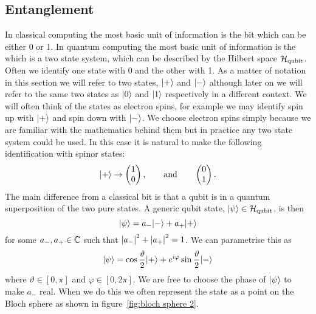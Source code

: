     \subsection{Entanglement}
    In classical computing the most basic unit of information is the bit which can be either 0 or 1.
    In quantum computing the most basic unit of information is the  which is a two state system, which can be described by the Hilbert space \(\mathcal{H}_\text{qubit}\).
    Often we identify one state with 0 and the other with 1.
    As a matter of notation in this section we will refer to two states, \(\vert {+} \rangle\) and \(\vert {-} \rangle\) although later on we will refer to the same two states as \(\vert {0} \rangle\) and \(\vert {1} \rangle\) respectively in a different context.
    We will often think of the states as electron spins, for example we may identify spin up with \(\vert {+} \rangle\) and spin down with \(\vert {-} \rangle\).
    We choose electron spins simply because we are familiar with the mathematics behind them but in practice any two state system could be used.
    In this case it is natural to make the following identification with spinor states:
    \[
        \vert {+} \rangle \mathrel{\rightarrow} 
        \begin{pmatrix}
            1\\ 0
        \end{pmatrix}
        , \qquad\text{and}\qquad
        \begin{pmatrix}
            0\\ 1
        \end{pmatrix}
        .
    \]
    The main difference from a classical bit is that a qubit is in a quantum superposition of the two pure states.
    A generic qubit state, \(\vert {\psi} \rangle\in\mathcal{H}_{\text{qubit}}\), is then
    \[\vert {\psi} \rangle = a_-\vert {-} \rangle + a_+\vert {+} \rangle\]
    for some \(a_-, a_+\in\mathbb{C}\) such that \(\abs{a_-}^2 + \abs{a_+}^2 = 1\).
    We can parametrise this as
    \[\vert {\psi} \rangle = \cos\frac{\vartheta}{2}\vert {+} \rangle + e^{i\varphi}\sin\frac{\vartheta}{2}\vert {-} \rangle\]
    where \(\vartheta\in[0, \pi]\) and \(\varphi\in[0, 2\pi]\).
    We are free to choose the phase of \(\vert {\psi} \rangle\) to make \(a_-\) real.
    When we do this we often represent the state as a point on the Bloch sphere as shown in figure~\ref{fig:bloch sphere 2}.
    \tikzexternaldisable
